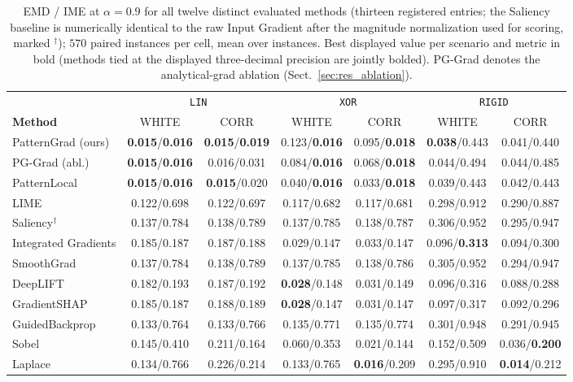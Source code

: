 \documentclass[pdflatex,sn-mathphys-num]{sn-jnl}
\theoremstyle{thmstyleone}
\theoremstyle{thmstyletwo}%
\theoremstyle{thmstylethree}%
\begin{document}
\begin{table}[t]
\centering
\caption{EMD / IME at $\alpha = 0.9$ for all twelve distinct evaluated methods (thirteen registered entries; the Saliency baseline is numerically identical to the raw Input Gradient after the magnitude normalization used for scoring, marked $^{\dagger}$); $570$ paired instances per cell, mean over instances. Best displayed value per scenario and metric in bold (methods tied at the displayed three-decimal precision are jointly bolded). PG-Grad denotes the analytical-grad ablation (Sect.~\ref{sec:res_ablation}).}
\label{tab:headline}
\footnotesize
\setlength{\tabcolsep}{2.1pt}
\begin{tabular}{lcccccc}
\toprule
 & \multicolumn{2}{c}{\texttt{LIN}} & \multicolumn{2}{c}{\texttt{XOR}} & \multicolumn{2}{c}{\texttt{RIGID}} \\
\textbf{Method} & WHITE & CORR & WHITE & CORR & WHITE & CORR \\
\midrule
PatternGrad (ours) & \textbf{0.015}/\textbf{0.016} & \textbf{0.015}/\textbf{0.019} & 0.123/\textbf{0.016} & 0.095/\textbf{0.018} & \textbf{0.038}/0.443 & 0.041/0.440 \\
PG-Grad (abl.) & \textbf{0.015}/\textbf{0.016} & 0.016/0.031 & 0.084/\textbf{0.016} & 0.068/\textbf{0.018} & 0.044/0.494 & 0.044/0.485 \\
PatternLocal & \textbf{0.015}/\textbf{0.016} & \textbf{0.015}/0.020 & 0.040/\textbf{0.016} & 0.033/\textbf{0.018} & 0.039/0.443 & 0.042/0.443 \\
LIME & 0.122/0.698 & 0.122/0.697 & 0.117/0.682 & 0.117/0.681 & 0.298/0.912 & 0.290/0.887 \\
Saliency$^{\dagger}$ & 0.137/0.784 & 0.138/0.789 & 0.137/0.785 & 0.138/0.787 & 0.306/0.952 & 0.295/0.947 \\
Integrated Gradients & 0.185/0.187 & 0.187/0.188 & 0.029/0.147 & 0.033/0.147 & 0.096/\textbf{0.313} & 0.094/0.300 \\
SmoothGrad & 0.137/0.784 & 0.138/0.789 & 0.137/0.785 & 0.138/0.786 & 0.305/0.952 & 0.294/0.947 \\
DeepLIFT & 0.182/0.193 & 0.187/0.192 & \textbf{0.028}/0.148 & 0.031/0.149 & 0.096/0.316 & 0.088/0.288 \\
GradientSHAP & 0.185/0.187 & 0.188/0.189 & \textbf{0.028}/0.147 & 0.031/0.147 & 0.097/0.317 & 0.092/0.296 \\
GuidedBackprop & 0.133/0.764 & 0.133/0.766 & 0.135/0.771 & 0.135/0.774 & 0.301/0.948 & 0.291/0.945 \\
Sobel & 0.145/0.410 & 0.211/0.164 & 0.060/0.353 & 0.021/0.144 & 0.152/0.509 & 0.036/\textbf{0.200} \\
Laplace & 0.134/0.766 & 0.226/0.214 & 0.133/0.765 & \textbf{0.016}/0.209 & 0.295/0.910 & \textbf{0.014}/0.212 \\
\bottomrule
\end{tabular}
\end{table}
\end{document}
